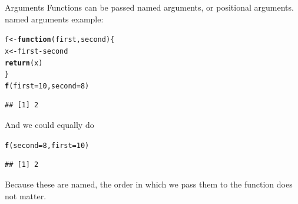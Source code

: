 \documentclass{beamer}\usepackage[]{graphicx}\usepackage[]{color}
\makeatletter
\newcommand{\hlnum}[1]{\textcolor[rgb]{0.686,0.059,0.569}{#1}}%
\newcommand{\hlopt}[1]{\textcolor[rgb]{0,0,0}{#1}}%
\newcommand{\hlstd}[1]{\textcolor[rgb]{0.345,0.345,0.345}{#1}}%
\newcommand{\hlkwa}[1]{\textcolor[rgb]{0.161,0.373,0.58}{\textbf{#1}}}%
\newcommand{\hlkwb}[1]{\textcolor[rgb]{0.69,0.353,0.396}{#1}}%
\newcommand{\hlkwc}[1]{\textcolor[rgb]{0.333,0.667,0.333}{#1}}%
\newcommand{\hlkwd}[1]{\textcolor[rgb]{0.737,0.353,0.396}{\textbf{#1}}}%
\newenvironment{kframe}{%
 \def\at@end@of@kframe{}%
 \ifinner\ifhmode%
  \def\at@end@of@kframe{\end{minipage}}%
  \begin{minipage}{\columnwidth}%
 \fi\fi%
 \def\FrameCommand##1{\hskip\@totalleftmargin \hskip-\fboxsep
 \colorbox{shadecolor}{##1}\hskip-\fboxsep
     \hskip-\linewidth \hskip-\@totalleftmargin \hskip\columnwidth}%
 \MakeFramed {\advance\hsize-\width
   \@totalleftmargin\z@ \linewidth\hsize
   \@setminipage}}%
 {\par\unskip\endMakeFramed%
 \at@end@of@kframe}
\newenvironment{knitrout}{}{} %
\makeatother
\begin{document}
\begin{frame}[fragile]{Arguments}
Functions can be passed named arguments, or positional arguments.
\linebreak
named arguments example:
\begin{knitrout}
\color{fgcolor}\begin{kframe}
\begin{alltt}
\hlstd{f} \hlkwb{<-} \hlkwa{function}\hlstd{(}\hlkwc{first}\hlstd{,} \hlkwc{second}\hlstd{) \{}
    \hlstd{x} \hlkwb{<-} \hlstd{first} \hlopt{-} \hlstd{second}
    \hlkwd{return}\hlstd{(x)}
\hlstd{\}}
\hlkwd{f}\hlstd{(}\hlkwc{first} \hlstd{=} \hlnum{10}\hlstd{,} \hlkwc{second} \hlstd{=} \hlnum{8}\hlstd{)}
\end{alltt}
\begin{verbatim}
## [1] 2
\end{verbatim}
\end{kframe}
\end{knitrout}

And we could equally do
\begin{knitrout}
\color{fgcolor}\begin{kframe}
\begin{alltt}
\hlkwd{f}\hlstd{(}\hlkwc{second} \hlstd{=} \hlnum{8}\hlstd{,} \hlkwc{first} \hlstd{=} \hlnum{10}\hlstd{)}
\end{alltt}
\begin{verbatim}
## [1] 2
\end{verbatim}
\end{kframe}
\end{knitrout}

Because these are named, the order in which we pass them to the function does not matter.
\end{frame}
\end{document}
